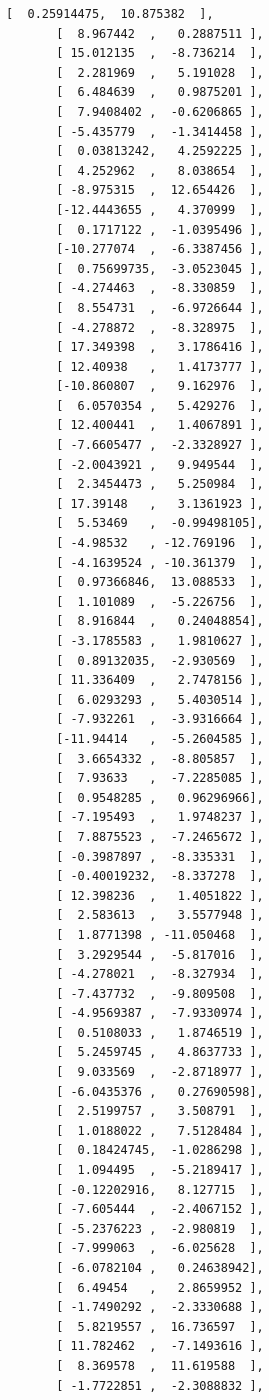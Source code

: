 \documentclass[11pt]{article}
\begin{document}
\begin{tcolorbox}[breakable, size=fbox, boxrule=.5pt, pad at break*=1mm, opacityfill=0]
\begin{Verbatim}[commandchars=\\\{\}]
       [  0.25914475,  10.875382  ],
       [  8.967442  ,   0.2887511 ],
       [ 15.012135  ,  -8.736214  ],
       [  2.281969  ,   5.191028  ],
       [  6.484639  ,   0.9875201 ],
       [  7.9408402 ,  -0.6206865 ],
       [ -5.435779  ,  -1.3414458 ],
       [  0.03813242,   4.2592225 ],
       [  4.252962  ,   8.038654  ],
       [ -8.975315  ,  12.654426  ],
       [-12.4443655 ,   4.370999  ],
       [  0.1717122 ,  -1.0395496 ],
       [-10.277074  ,  -6.3387456 ],
       [  0.75699735,  -3.0523045 ],
       [ -4.274463  ,  -8.330859  ],
       [  8.554731  ,  -6.9726644 ],
       [ -4.278872  ,  -8.328975  ],
       [ 17.349398  ,   3.1786416 ],
       [ 12.40938   ,   1.4173777 ],
       [-10.860807  ,   9.162976  ],
       [  6.0570354 ,   5.429276  ],
       [ 12.400441  ,   1.4067891 ],
       [ -7.6605477 ,  -2.3328927 ],
       [ -2.0043921 ,   9.949544  ],
       [  2.3454473 ,   5.250984  ],
       [ 17.39148   ,   3.1361923 ],
       [  5.53469   ,  -0.99498105],
       [ -4.98532   , -12.769196  ],
       [ -4.1639524 , -10.361379  ],
       [  0.97366846,  13.088533  ],
       [  1.101089  ,  -5.226756  ],
       [  8.916844  ,   0.24048854],
       [ -3.1785583 ,   1.9810627 ],
       [  0.89132035,  -2.930569  ],
       [ 11.336409  ,   2.7478156 ],
       [  6.0293293 ,   5.4030514 ],
       [ -7.932261  ,  -3.9316664 ],
       [-11.94414   ,  -5.2604585 ],
       [  3.6654332 ,  -8.805857  ],
       [  7.93633   ,  -7.2285085 ],
       [  0.9548285 ,   0.96296966],
       [ -7.195493  ,   1.9748237 ],
       [  7.8875523 ,  -7.2465672 ],
       [ -0.3987897 ,  -8.335331  ],
       [ -0.40019232,  -8.337278  ],
       [ 12.398236  ,   1.4051822 ],
       [  2.583613  ,   3.5577948 ],
       [  1.8771398 , -11.050468  ],
       [  3.2929544 ,  -5.817016  ],
       [ -4.278021  ,  -8.327934  ],
       [ -7.437732  ,  -9.809508  ],
       [ -4.9569387 ,  -7.9330974 ],
       [  0.5108033 ,   1.8746519 ],
       [  5.2459745 ,   4.8637733 ],
       [  9.033569  ,  -2.8718977 ],
       [ -6.0435376 ,   0.27690598],
       [  2.5199757 ,   3.508791  ],
       [  1.0188022 ,   7.5128484 ],
       [  0.18424745,  -1.0286298 ],
       [  1.094495  ,  -5.2189417 ],
       [ -0.12202916,   8.127715  ],
       [ -7.605444  ,  -2.4067152 ],
       [ -5.2376223 ,  -2.980819  ],
       [ -7.999063  ,  -6.025628  ],
       [ -6.0782104 ,   0.24638942],
       [  6.49454   ,   2.8659952 ],
       [ -1.7490292 ,  -2.3330688 ],
       [  5.8219557 ,  16.736597  ],
       [ 11.782462  ,  -7.1493616 ],
       [  8.369578  ,  11.619588  ],
       [ -1.7722851 ,  -2.3088832 ],

\end{Verbatim}
\end{tcolorbox}
\end{document}
